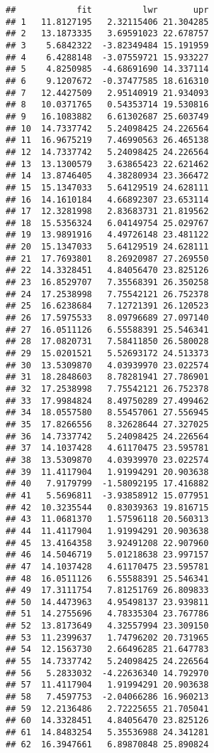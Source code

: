\documentclass[]{article}
\begin{document}
\begin{verbatim}
##            fit          lwr       upr
## 1   11.8127195   2.32115406 21.304285
## 2   13.1873335   3.69591023 22.678757
## 3    5.6842322  -3.82349484 15.191959
## 4    6.4288148  -3.07559721 15.933227
## 5    4.8250985  -4.68691690 14.337114
## 6    9.1207672  -0.37477585 18.616310
## 7   12.4427509   2.95140919 21.934093
## 8   10.0371765   0.54353714 19.530816
## 9   16.1083882   6.61302687 25.603749
## 10  14.7337742   5.24098425 24.226564
## 11  16.9675219   7.46990563 26.465138
## 12  14.7337742   5.24098425 24.226564
## 13  13.1300579   3.63865423 22.621462
## 14  13.8746405   4.38280934 23.366472
## 15  15.1347033   5.64129519 24.628111
## 16  14.1610184   4.66892307 23.653114
## 17  12.3281998   2.83683731 21.819562
## 18  15.5356324   6.04149754 25.029767
## 19  13.9891916   4.49726148 23.481122
## 20  15.1347033   5.64129519 24.628111
## 21  17.7693801   8.26920987 27.269550
## 22  14.3328451   4.84056470 23.825126
## 23  16.8529707   7.35568391 26.350258
## 24  17.2538998   7.75542121 26.752378
## 25  16.6238684   7.12721391 26.120523
## 26  17.5975533   8.09796689 27.097140
## 27  16.0511126   6.55588391 25.546341
## 28  17.0820731   7.58411850 26.580028
## 29  15.0201521   5.52693172 24.513373
## 30  13.5309870   4.03939970 23.022574
## 31  18.2848603   8.78281941 27.786901
## 32  17.2538998   7.75542121 26.752378
## 33  17.9984824   8.49750289 27.499462
## 34  18.0557580   8.55457061 27.556945
## 35  17.8266556   8.32628644 27.327025
## 36  14.7337742   5.24098425 24.226564
## 37  14.1037428   4.61170475 23.595781
## 38  13.5309870   4.03939970 23.022574
## 39  11.4117904   1.91994291 20.903638
## 40   7.9179799  -1.58092195 17.416882
## 41   5.5696811  -3.93858912 15.077951
## 42  10.3235544   0.83039363 19.816715
## 43  11.0681370   1.57596118 20.560313
## 44  11.4117904   1.91994291 20.903638
## 45  13.4164358   3.92491208 22.907960
## 46  14.5046719   5.01218638 23.997157
## 47  14.1037428   4.61170475 23.595781
## 48  16.0511126   6.55588391 25.546341
## 49  17.3111754   7.81251769 26.809833
## 50  14.4473963   4.95498137 23.939811
## 51  14.2755696   4.78335304 23.767786
## 52  13.8173649   4.32557994 23.309150
## 53  11.2399637   1.74796202 20.731965
## 54  12.1563730   2.66496285 21.647783
## 55  14.7337742   5.24098425 24.226564
## 56   5.2833032  -4.22636340 14.792970
## 57  11.4117904   1.91994291 20.903638
## 58   7.4597753  -2.04066286 16.960213
## 59  12.2136486   2.72225655 21.705041
## 60  14.3328451   4.84056470 23.825126
## 61  14.8483254   5.35536988 24.341281
## 62  16.3947661   6.89870848 25.890824

\end{verbatim}
\end{document}
